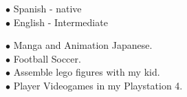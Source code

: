 \documentclass[9pt]{developercv} %
\begin{document}

\begin{minipage}[t]{0.4\textwidth}	
	\vspace{-\baselineskip} %

	$\bullet$ {Spanish} - native\\
	$\bullet$ {English} - Intermediate\\


	\vspace{-\baselineskip} %

		$\bullet$ Manga and Animation Japanese.\\
		$\bullet$ Football Soccer.\\  
		$\bullet$ Assemble lego figures with my kid.\\ 
		$\bullet$ Player Videogames in my Playstation 4.

\end{minipage}

\end{document}
